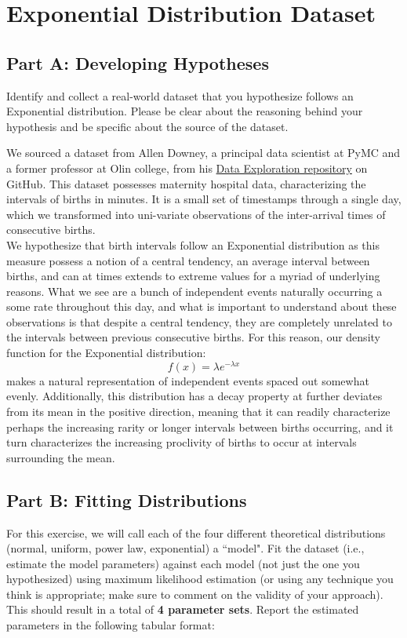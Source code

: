 \section{Exponential Distribution Dataset}

\subsection{Part A: Developing Hypotheses}
Identify and collect a real-world dataset that you hypothesize follows an Exponential distribution. Please be clear about the reasoning behind your hypothesis and be specific about the source of the dataset.

We sourced a dataset from Allen Downey, a principal data scientist at PyMC and a former professor at Olin college, from his  \hyperlink{https://github.com/AllenDowney/DataExploration}{Data Exploration repository} on GitHub. This dataset possesses maternity hospital data, characterizing the intervals of births in minutes. It is a small set of timestamps through a single day, which we transformed into uni-variate observations of the inter-arrival times of consecutive births.\\

We hypothesize that birth intervals follow an Exponential distribution as this measure possess a notion of a central tendency, an average interval between births, and can at times extends to extreme values for a myriad of underlying reasons. What we see are a bunch of independent events naturally occurring a some rate throughout this day, and what is important to understand about these observations is that despite a central tendency, they are completely unrelated to the intervals between previous consecutive births. For this reason, our density function for the Exponential distribution:
$$
f(x) = \lambda e^{-\lambda x}
$$
makes a natural representation of independent events spaced out somewhat evenly. Additionally, this distribution has a decay property at further deviates from its mean in the positive direction, meaning that it can readily characterize perhaps the increasing rarity or longer intervals between births occurring, and it turn characterizes the increasing proclivity of births to occur at intervals surrounding the mean.
\newpage

\subsection{Part B: Fitting Distributions}
For this exercise, we will call each of the four different theoretical distributions (normal, uniform, power law, exponential) a ``model". Fit the dataset (i.e., estimate the model parameters) against each model (not just the one you hypothesized) using maximum likelihood estimation (or using any technique you think is appropriate; make sure to comment on the validity of your approach). This should result in a total of \textbf{4 parameter sets}. Report the estimated parameters in the following tabular format:

